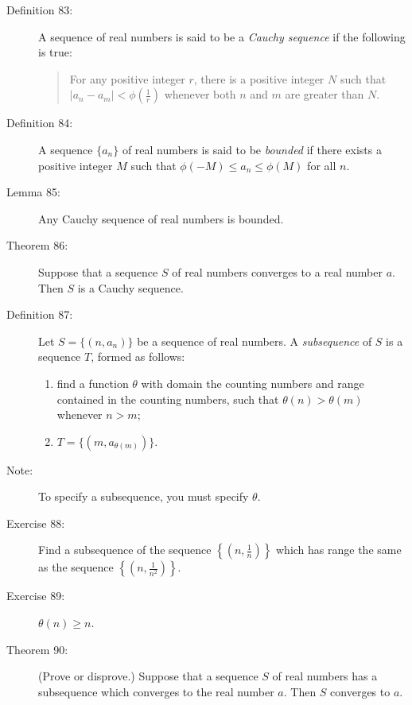 \documentclass{article}
\begin{document}
\begin{description}
  \item[Definition 83:] A sequence of real numbers is said to be a \emph{Cauchy sequence} if the following is true: 
    \begin{quote}
    For any positive integer $r$, there is a positive integer $N$ such that $|a_{n}-a_{m}| < \phi \left( \frac{1}{r} \right)$ whenever both $n$ and $m$ are greater than $N$.
    \end{quote}

  \item[Definition 84:] A sequence $\{ a_{n} \}$ of real numbers is said to be \emph{bounded} if there exists a positive integer $M$ such that $\phi(-M) \leq a_{n} \leq \phi(M)$ for all $n$.

  \item[Lemma 85:] Any Cauchy sequence of real numbers is bounded. 

  \item[Theorem 86:] Suppose that a sequence $S$ of real numbers converges to a real number $a$. Then $S$ is a Cauchy sequence.

  \item[Definition 87:] Let $S = \{ (n, a_{n}) \}$ be a sequence of real numbers. A \emph{subsequence} of $S$ is a sequence $T$, formed as follows:
    \begin{enumerate}[\hspace{1cm}1.]
      \item find a function $\theta$ with domain the counting numbers and range contained in the counting numbers, such that $\theta(n) > \theta(m)$ whenever $n > m$;
      \item $T = \{ (m, a_{\theta(m)} ) \}$.
    \end{enumerate}

  \item[Note:] To specify a subsequence, you must specify $\theta$.

  \item[Exercise 88:] Find a subsequence of the sequence $\left\{ \left( n, \frac{1}{n} \right) \right\}$ which has range the same as the sequence $\left\{ \left( n, \frac{1}{n^{2}} \right) \right\}$.

  \item[Exercise 89:] $\theta (n) \geq n$. 

  \item[Theorem 90:] (Prove or disprove.) Suppose that a sequence $S$ of real numbers has a subsequence which converges to the real number $a$. Then $S$ converges to $a$.


\end{description}
\end{document}

